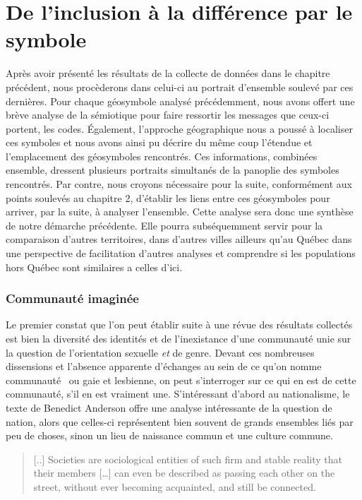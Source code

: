 
\chapter{De l'inclusion à la différence par le symbole}
\label{cha:de_l_inclusion_la_diff_rence_par_le_symbole}

Après avoir présenté les résultats de la collecte de données dans le chapitre précédent, nous procèderons dans celui-ci au portrait d'ensemble soulevé par ces dernières.
Pour chaque géosymbole analysé précédemment, nous avons offert une brève analyse de la sémiotique pour faire ressortir les messages que ceux-ci portent, les codes.
Également, l'approche géographique nous a poussé à localiser ces symboles et nous avons ainsi pu décrire du même coup l'étendue et l'emplacement des géosymboles rencontrés.
Ces informations, combinées ensemble, dressent plusieurs portraits simultanés de la panoplie des symboles rencontrés.
Par contre, nous croyons nécessaire pour la suite, conformément aux points soulevés au chapitre 2, d'établir les liens entre ces géosymboles pour arriver, par la suite, à analyser l'ensemble.
Cette analyse sera donc une synthèse de notre démarche précédente.
Elle pourra subséquemment servir pour la comparaison d'autres territoires, dans d'autres villes ailleurs qu'au Québec dans une perspective de facilitation d'autres analyses et comprendre si les populations \lgbt{} hors Québec sont similaires a celles d'ici.


\subsection{Communauté imaginée}
\label{sub:communaut_imagin_e}
Le premier constat que l'on peut établir suite à une révue des résultats collectés est bien la diversité des identités \lgbt{} et de l'inexistance d'une communauté unie sur la question de l'orientation sexuelle \emph{et} de genre.
Devant ces nombreuses dissensions et l'absence apparente d'échanges au sein de ce qu'on nomme communauté~\lgbt{} ou gaie et lesbienne, on peut s'interroger sur ce qui en est de cette communauté, s'il en est vraiment une.
S'intéressant d'abord au nationalisme, le texte de Benedict Anderson offre une analyse intéressante de la question de nation, alors que celles-ci représentent bien souvent de grands ensembles liés par peu de choses, sinon un lieu de naissance commun et une culture commune.
\begin{quote}
[..] Societies are sociological entities of such firm and stable reality that their members […] can even be described as passing each other on the street, without ever becoming acquainted, and still be connected.~\citep[25]{Anderson1983}
\end{quote}

